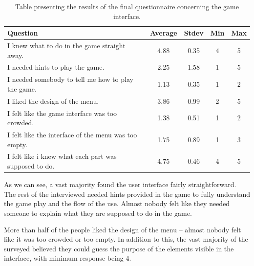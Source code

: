 \begin{table}
\begin{center}
\begin{tabular}{| p{8cm} | c | c | c | c | } 																	  \hline 
 \textbf{Question} & \textbf{Average} & \textbf{Stdev} & \textbf{Min} & \textbf{Max } \\ \hline \hline
 I knew what to do in the game straight away. 				& 4.88 & 0.35 & 4 & 5		   \\ \hline 
 I needed hints to play the game. 								& 2.25 & 1.58 & 1 & 5 	   \\ \hline 
 I needed somebody to tell me how to play the game. 	& 1.13 & 0.35 & 1 & 2  	   \\ \hline 
 I liked the design of the menu. 									& 3.86 & 0.99 & 2 & 5   	   \\ \hline 
 I felt like the game interface was too crowded. 				& 1.38 & 0.51 & 1 & 2 	   \\ \hline 
 I felt like the interface of the menu was too empty.		& 1.75 & 0.89 & 1 & 3		   \\ \hline
 I felt like i knew what each part was supposed to do. 	& 4.75 & 0.46 & 4 & 5		   \\ \hline
\end{tabular}
\caption{Table presenting the results of the final questionnaire concerning the game interface.}
\label{table:finalquestionsinterface}
\end{center}
\end{table}

As we can see, a vast majority found the user interface fairly straightforward. The rest of the interviewed needed hints provided in the game to fully understand the game play and the flow of the use. Almost nobody felt like they needed someone to explain what they are supposed to do in the game. 

More than half of the people liked the design of the menu -- almost nobody felt like it was too crowded or too empty. In addition to this, the vast majority of the surveyed believed they could guess the purpose of the elements visible in the interface, with minimum response being 4.

